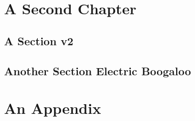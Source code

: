 \documentclass[a4paper, twoside]{report}
\begin{document}
\chapter{A Second Chapter}

    \lipsum[1]
    \section{A Section v2}
        \lipsum
    \section{Another Section Electric Boogaloo}
        \lipsum






\appendix
\appendixpage
\addappheadtotoc

\chapter{An Appendix}
\end{document}
